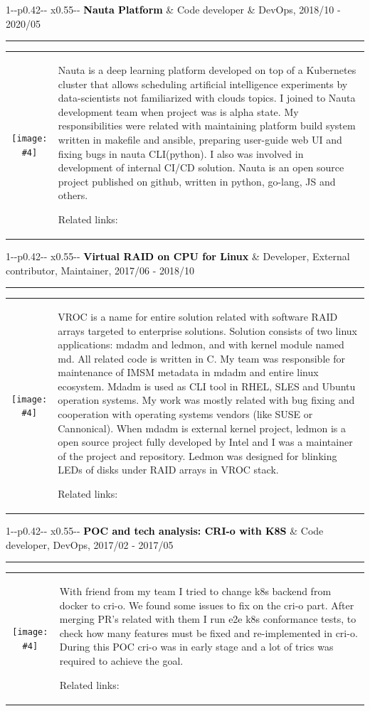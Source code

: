 \documentclass[11pt,A4]{article}
\newcommand{\mpwidth}{\linewidth-\fboxsep-\fboxsep}
\newcommand{\portfolioitem}[8]
{
\medskip\medskip
\vspace{8pt}
	\begin{tabular*}{1\mpwidth}{p{0.42\mpwidth}  x{0.55\mpwidth}}
 	\textcolor{black}{\textbf{#2}} & \textcolor{complcol}{#3}, \textcolor{bgcol}{#1}

	\end{tabular*}
\vspace{-12pt}
\textcolor{softcol}{\hrule}
\vspace{5pt}
  \begin{tabular}{ c m{13cm} }
    \begin{minipage}{.3\textwidth}
         \textcolor{white}{#8}\texttt{[image: \#4]}
    \end{minipage}
    & #6

Related links: #7 \\
  \end{tabular}
}
\newcommand{\portfoliohref}[2]{
\href[pdfnewwindow=true]{#1}{\color{complcol}{#2}}
}
\begin{document}
\portfolioitem{2018/10 - 2020/05}{Nauta Platform}{Code developer \& DevOps}{img/nauta.png}{1.1}
{Nauta is a deep learning platform developed on top of a Kubernetes cluster that allows scheduling artificial intelligence experiments by data-scientists not familiarized with clouds topics. I joined to Nauta development team when project was is alpha state. My responsibilities were related with maintaining platform build system written in makefile and ansible, preparing user-guide web UI and fixing bugs in nauta CLI(python). I also was involved in development of internal CI/CD solution. Nauta is an open source project published on github, written in python, go-lang, JS and others.}
{\portfoliohref{https://github.com/IntelAI/nauta/commit/7efbdac3e9cc4d64afd6b6e6fb0481e2b2436ff9}{UI component} | \portfoliohref{https://github.com/IntelAI/nauta/commit/c4ecc8a44ba212516ec4dd2f9a4bf830ed589701}{Build system change} | \portfoliohref{https://github.com/IntelAI/nauta/commit/abde914c1eccf2612774e67646564a2f61caa44e}{Nauta CLI change}}{}

\portfolioitem{2017/06 - 2018/10}{Virtual RAID on CPU for Linux}{Developer, External contributor, Maintainer}{img/vroc.jpg}{1.0}
{VROC is a name for entire solution related with software RAID arrays targeted to enterprise solutions. Solution consists of two linux applications: mdadm and ledmon, and with kernel module named md. All related code is written in C. My team was responsible for maintenance of IMSM metadata in mdadm and entire linux ecosystem. Mdadm is used as CLI tool in RHEL, SLES and Ubuntu operation systems. My work was mostly related with bug fixing and cooperation with operating systems vendors (like SUSE or Cannonical). When mdadm is external kernel project, ledmon is a open source project fully developed by Intel and I was a maintainer of the project and repository. Ledmon was designed for blinking LEDs of disks under RAID arrays in VROC stack.}
{\portfoliohref{https://github.com/intel/ledmon/commits?author=mzylowski}{My ledmon commits} | \portfoliohref{https://git.kernel.org/pub/scm/linux/kernel/git/torvalds/linux.git/commit/scripts/checkpatch.pl?id=6ad724e2a48fc24dd9788490d85a3490cb0117c1}{Kernel patch} | \portfoliohref{https://git.kernel.org/pub/scm/utils/mdadm/mdadm.git/log/?qt=grep\&q=Michal+Zylowski}{My mdadm patches}}{}

\portfolioitem{2017/02 - 2017/05}{POC and tech analysis: CRI-o with K8S}{Code developer, DevOps}{img/crio-logo.png}{1}
{With friend from my team I tried to change k8s backend from docker to cri-o. We found some issues to fix on the cri-o part. After merging PR’s related with them I run e2e k8s conformance tests, to check how many features must be fixed and re-implemented in cri-o. During this POC cri-o was in early stage and a lot of trics was required to achieve the goal.}
{\portfoliohref{https://github.com/cri-o/cri-o/pull/342}{Example of contribution} | \portfoliohref{https://github.com/cri-o/cri-o/pull/353}{Result of the POC}}{}
\end{document}
